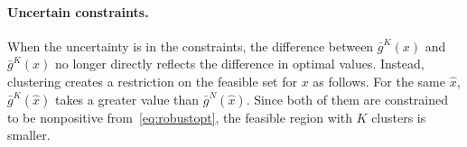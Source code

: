 \documentclass[12pt]{article}
\theoremstyle{thmstyleone}%
\theoremstyle{thmstyletwo}%
\theoremstyle{thmstylethree}%
\begin{document}


\paragraph{Uncertain constraints.}%
\label{par:uncertain_constraints_}
When the uncertainty is in the constraints, the difference between $\bar{g}^K(x)$ and $\bar{g}^K(x)$ no longer directly reflects the difference in optimal values.
Instead, clustering creates a restriction on the feasible set for $x$ as follows.
For the same $\hat{x}$, $\bar{g}^K(\hat{x})$ takes a greater value than $\bar{g}^N(\hat{x})$.
Since both of them are constrained to be nonpositive from~\eqref{eq:robustopt}, the feasible region with $K$ clusters is smaller.

\end{document}
